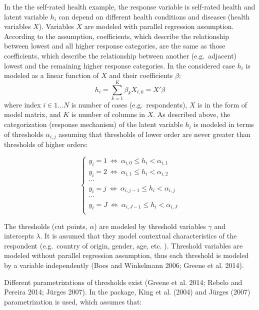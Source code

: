 \documentclass[]{article}
\begin{document}
In the the self-rated health example, the response variable is
self-rated health and latent variable \(h_i\) can depend on different
health conditions and diseases (health variables \(X\)). Variables \(X\)
are modeled with parallel regression assumption. According to the
assumption, coefficients, which describe the relationship between lowest
and all higher response categories, are the same as those coefficients,
which describe the relationship between another (e.g.~adjacent) lowest
and the remaining higher response categories. In the considered case
\(h_i\) is modeled as a linear function of \(X\) and their coefficients
\(\beta\): \begin{equation}
\label{eq:1}
h_{i} = \sum_{k=1}^K \beta_kX_{i,k} = X'\beta
\end{equation} where index \(i \in 1...N\) is number of cases
(e.g.~respondents), \(X\) is in the form of model matrix, and \(K\) is
number of columns in \(X\). As described above, the categorization
(response mechanism) of the latent variable \(h_i\) is modeled in terms
of thresholds \(\alpha_{i,j}\) assuming that thresholds of lower order
are never greater than thresholds of higher orders:

\begin{equation}
\label{eq:2}
\begin{cases}
y_i = 1 ~\Leftrightarrow~ \alpha_{i,0} \leq h_i < \alpha_{i,1}\\
y_i = 2 ~\Leftrightarrow~ \alpha_{i,1} \leq h_i < \alpha_{i,2}\\
\cdots\\
y_i = j~ \Leftrightarrow~ \alpha_{i,j-1} \leq h_i < \alpha_{i,j}\\
\cdots\\
y_i = J~ \Leftrightarrow~ \alpha_{i,J-1} \leq h_i < \alpha_{i,J}\\
\end{cases}
\end{equation}

The thresholds (cut points, \(\alpha\)) are modeled by threshold
variables \(\gamma\) and intercepts \(\lambda\). It is assumed that they
model contextual characteristics of the respondent (e.g.~country of
origin, gender, age, etc. ). Threshold variables are modeled without
parallel regression assumption, thus each threshold is modeled by a
variable independently (Boes and Winkelmann 2006; Greene et al. 2014).

Different parametrizations of thresholds exist (Greene et al. 2014;
Rebelo and Pereira 2014; Jürges 2007). In the package, King et al.
(2004) and Jürges (2007) parametrization is used, which assumes that:
\end{document}
